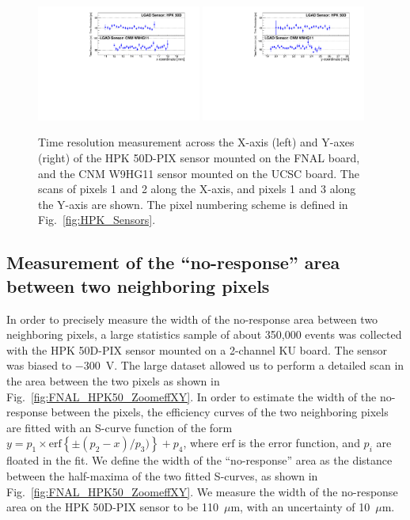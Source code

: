 \documentclass[preprint,1p]{elsarticle}
\begin{document}
\begin{figure}[htbp] 
\centering
\includegraphics[width=0.48\textwidth]{figs/HPK50DVsCNM_TimeResolution_vs_X.pdf} 
\includegraphics[width=0.48\textwidth]{figs/HPK50DVsCNM_TimeResolution_vs_Y.pdf} 
\caption{Time resolution measurement across the X-axis (left) and Y-axes (right) of the 
HPK 50D-PIX sensor mounted on the FNAL board, and the CNM W9HG11 sensor mounted on the 
UCSC board. The scans of pixels 1 and 2 along the X-axis, and pixels 1 and 3 along the Y-axis are shown.
The pixel numbering scheme is defined in Fig.~\ref{fig:HPK_Sensors}.} 
\label{fig:FNAL_HPK50_SigmaTXY} 
\end{figure} 


\subsection{Measurement of the ``no-response'' area between two neighboring pixels}
\label{sec:HPK_50D_gap}

In order to precisely measure the width of the no-response area between two
neighboring pixels, a large statistics sample of about 350,000 events was
collected with the HPK 50D-PIX sensor mounted on a 2-channel KU board. The sensor
was biased to $-300$~V. The large dataset allowed us to perform a
detailed scan in the area between the two pixels as shown in
Fig.~\ref{fig:FNAL_HPK50_ZoomeffXY}. In order to estimate the width of the
no-response between the pixels, the efficiency curves of the two neighboring
pixels are fitted with an S-curve function of the form $y=p_1\times
\mathrm{erf}\left\{\pm(p_2-x)/p_3)\right\}+p_4$, where $\mathrm{erf}$ is the error
function, and $p_i$ are floated in the fit. We define the width of the
``no-response'' area as the distance between the half-maxima of the two fitted
S-curves, as shown in Fig.~\ref{fig:FNAL_HPK50_ZoomeffXY}. We measure the width
of the no-response area on the HPK 50D-PIX sensor to be 110~$\mu$m, with an
uncertainty of 10~$\mu$m.
\end{document}

